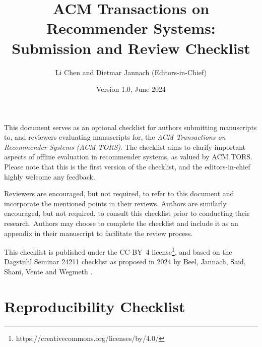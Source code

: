 \documentclass{article}
\title{ACM Transactions on Recommender Systems: Submission and Review Checklist}
\author{Li Chen and Dietmar Jannach (Editors-in-Chief)}
\date{Version 1.0, June 2024}
\begin{document}

\newcommand{\answerYes}[1]{{\textcolor{answerYesColor}{[Yes]}\xspace#1}}
\newcommand{\answerNo}[1]{{\textcolor{answerNoColor}{[No]}\xspace#1}}
\newcommand{\answerNA}[1]{{\textcolor{answerNAColor}{[N/A]}\xspace#1}}
\newcommand{\answerTODO}{\textcolor{answerTODOColor}{\textbf{[TODO]}}}


\maketitle

\noindent This document serves as an optional checklist for authors submitting manuscripts to, and reviewers evaluating manuscripts for, the \textit{ACM Transactions on Recommender Systems (ACM TORS)}. The checklist aims to clarify important aspects of offline evaluation in recommender systems, as valued by ACM TORS. Please note that this is the first version of the checklist, and the editors-in-chief highly welcome any feedback.

Reviewers are encouraged, but not required, to refer to this document and incorporate the mentioned points in their reviews. Authors are similarly encouraged, but not required, to consult this checklist prior to conducting their research. Authors may choose to complete the checklist and include it as an appendix in their manuscript to facilitate the review process.

This checklist is published under the CC-BY~4 license\footnote{https://creativecommons.org/licenses/by/4.0/}, and based on the Dagstuhl Seminar 24211 checklist as proposed in 2024 by Beel, Jannach, Said, Shani, Vente and Wegmeth \cite{Beel2024}.


\section{Reproducibility Checklist}
\end{document}
